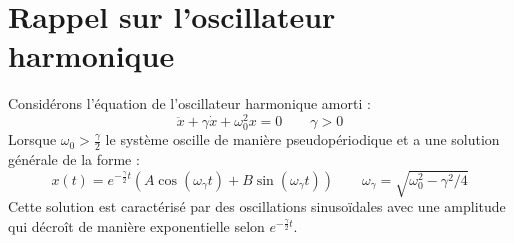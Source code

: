 \chapter{Rappel sur l'oscillateur harmonique}
%
Considérons l'équation de l'oscillateur harmonique amorti :
\begin{dmath}
    \ddot{x} + \gamma\dot{x} + \omega_0^2 x = 0
    \qquad {\gamma > 0}
\end{dmath}   
%
Lorsque $\omega_0 > \frac{\gamma}{2}$ le système oscille de manière pseudopériodique et a une solution générale de la forme :
%
\begin{dmath}
    x(t) = e^{-\frac{\gamma}{2}t}(A\cos(\omega_{\gamma} t) + B\sin(\omega_{\gamma} t))
    \qquad {\omega_{\gamma} = \sqrt{\omega_0^2 - \gamma^2/4}}
\end{dmath}
%
Cette solution est caractérisé par des oscillations sinusoïdales avec une amplitude qui décroît de manière exponentielle selon $e^{-\frac{\gamma}{2} t}$.
%
